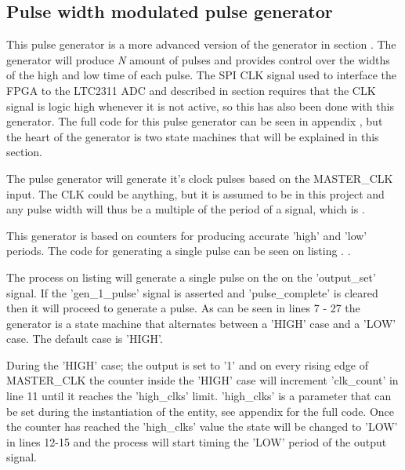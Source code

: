 \subsection{Pulse width modulated pulse generator} \label{subsec:PWMGen} 

This pulse generator is a more advanced version of the generator in section . The generator will produce \textit{N} amount of pulses and provides control over the widths of the high and low time of each pulse. The SPI CLK signal used to interface the FPGA to the LTC2311 ADC and described in section  requires that the CLK signal is logic high whenever it is not active, so this has also been done with this generator.
The full code for this pulse generator can be seen in appendix , but the heart of the generator is two state machines that will be explained in this section.

The pulse generator will generate it's clock pulses based on the MASTER\_CLK input. The CLK could be anything, but it is assumed to be  in this project and any pulse width will thus be a multiple of the period of a  signal, which is .

This generator is based on counters for producing accurate 'high' and 'low' periods. The code for generating a single pulse can be seen on listing .
. 

The process on listing  will generate a single pulse on the on the 'output\_set' signal. If the 'gen\_1\_pulse' signal is asserted and 'pulse\_complete' is cleared then it will proceed to generate a pulse. As can be seen in lines 7 - 27 the generator is a state machine that alternates between a 'HIGH' case and a 'LOW' case. The default case is 'HIGH'.

During the 'HIGH' case; the output is set to '1' and on every rising edge of MASTER\_CLK the counter inside the 'HIGH' case will increment 'clk\_count' in line 11 until it reaches the 'high\_clks' limit. 'high\_clks' is a parameter that can be set during the instantiation of the entity, see appendix  for the full code. Once the counter has reached the 'high\_clks' value the state will be changed to 'LOW' in lines 12-15 and the process will start timing the 'LOW' period of the output signal.

